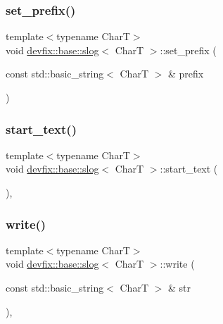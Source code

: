 \mbox{\label{structdevfix_1_1base_1_1slog_a45b6fbc2f61c949d8cb6762629707ca3}} 
\subsubsection{\texorpdfstring{set\+\_\+prefix()}{set\_prefix()}}
{\footnotesize\ttfamily template$<$typename CharT$>$ \\
void \hyperlink{structdevfix_1_1base_1_1slog}{devfix\+::base\+::slog}$<$ CharT $>$\+::set\+\_\+prefix (\begin{DoxyParamCaption}\item[{const std\+::basic\+\_\+string$<$ CharT $>$ \&}]{prefix }\end{DoxyParamCaption})\hspace{0.3cm}{\ttfamily [inline]}}

\mbox{\label{structdevfix_1_1base_1_1slog_a5e3a84ea7bcce1a17c5cf43398666f21}} 
\subsubsection{\texorpdfstring{start\+\_\+text()}{start\_text()}}
{\footnotesize\ttfamily template$<$typename CharT$>$ \\
void \hyperlink{structdevfix_1_1base_1_1slog}{devfix\+::base\+::slog}$<$ CharT $>$\+::start\+\_\+text (\begin{DoxyParamCaption}{ }\end{DoxyParamCaption})\hspace{0.3cm}{\ttfamily [inline]}, {\ttfamily [protected]}}

\mbox{\label{structdevfix_1_1base_1_1slog_ab9939cb04b4d419ce97687d5823ee79e}} 
\subsubsection{\texorpdfstring{write()}{write()}}
{\footnotesize\ttfamily template$<$typename CharT$>$ \\
void \hyperlink{structdevfix_1_1base_1_1slog}{devfix\+::base\+::slog}$<$ CharT $>$\+::write (\begin{DoxyParamCaption}\item[{const std\+::basic\+\_\+string$<$ CharT $>$ \&}]{str }\end{DoxyParamCaption})\hspace{0.3cm}{\ttfamily [inline]}, {\ttfamily [protected]}}



